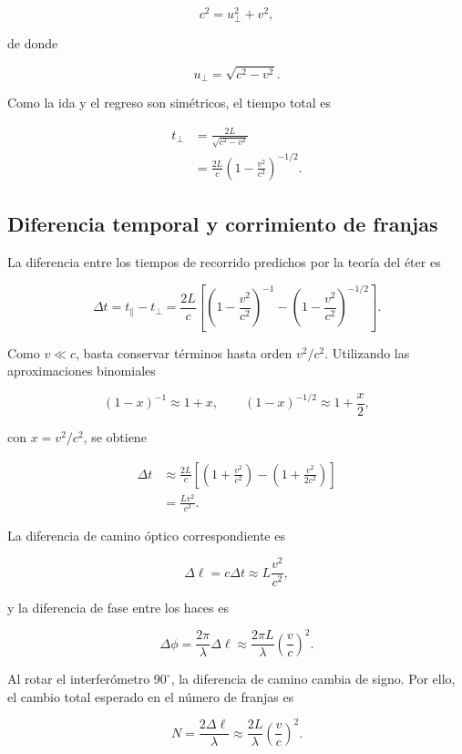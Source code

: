 \[
    c^2=u_{\perp}^2+v^2,
\]

de donde

\[
    u_{\perp}=\sqrt{c^2-v^2}.
\]

Como la ida y el regreso son simétricos, el tiempo total es

\begin{align*}
    t_{\perp}
    &=\frac{2L}{\sqrt{c^2-v^2}} \\
    &=\frac{2L}{c}
      \left(1-\frac{v^2}{c^2}\right)^{-1/2}.
\end{align*}

\subsection{Diferencia temporal y corrimiento de franjas}

La diferencia entre los tiempos de recorrido predichos por la teoría del éter es

\[
    \Delta t=t_{\parallel}-t_{\perp}
    =\frac{2L}{c}
    \left[
        \left(1-\frac{v^2}{c^2}\right)^{-1}
        -\left(1-\frac{v^2}{c^2}\right)^{-1/2}
    \right].
\]

Como $v\ll c$, basta conservar términos hasta orden $v^2/c^2$. Utilizando las aproximaciones binomiales

\[
    (1-x)^{-1}\approx 1+x,
    \qquad
    (1-x)^{-1/2}\approx 1+\frac{x}{2},
\]

con $x=v^2/c^2$, se obtiene

\begin{align*}
    \Delta t
    &\approx\frac{2L}{c}
      \left[
          \left(1+\frac{v^2}{c^2}\right)
          -\left(1+\frac{v^2}{2c^2}\right)
      \right] \\
    &=\frac{Lv^2}{c^3}.
\end{align*}

La diferencia de camino óptico correspondiente es

\[
    \Delta \ell=c\Delta t
    \approx L\frac{v^2}{c^2},
\]

y la diferencia de fase entre los haces es

\[
    \Delta\phi
    =\frac{2\pi}{\lambda}\Delta\ell
    \approx\frac{2\pi L}{\lambda}
    \left(\frac{v}{c}\right)^2.
\]

Al rotar el interferómetro $90^\circ$, la diferencia de camino cambia de signo. Por ello, el cambio total esperado en el número de franjas es

\[
    N=\frac{2\Delta\ell}{\lambda}
    \approx\frac{2L}{\lambda}
    \left(\frac{v}{c}\right)^2.
\]

